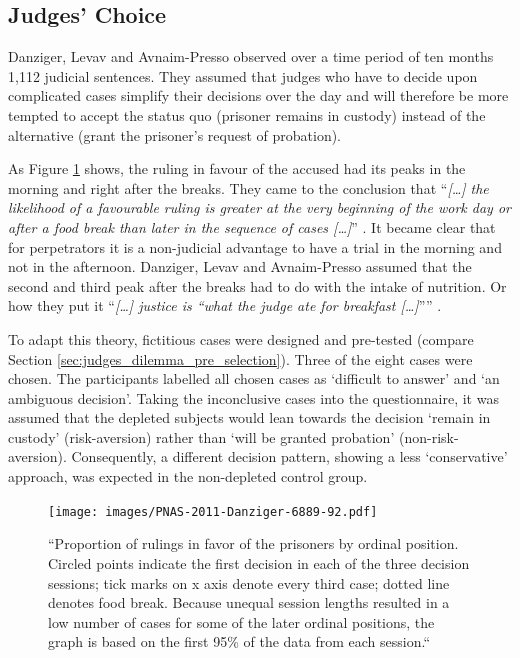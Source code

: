 \subsection{Judges’ Choice}\label{sec:judgeschoice}
Danziger, Levav and Avnaim-Presso \citep{danziger2011extraneous} observed over a time period of ten months 1,112 judicial sentences. They assumed that judges who have to decide upon complicated cases simplify their decisions over the day and will therefore be more tempted to accept the status quo (prisoner remains in custody) instead of the alternative (grant the prisoner’s request of probation).\par
As Figure \ref{fig:decisions_danziger} shows, the ruling in favour of the accused had its peaks in the morning and right after the breaks. They came to the conclusion that “\emph{[\ldots] the likelihood of a favourable ruling is greater at the very beginning of the work day or after a food break than later in the sequence of cases [\ldots]}” \citep[p.~6890]{danziger2011extraneous}. It became clear that for perpetrators it is a non-judicial advantage to have a trial in the morning and not in the afternoon. Danziger, Levav and Avnaim-Presso assumed that the second and third peak after the breaks had to do with the intake of nutrition. Or how they put it “\emph{[\ldots] justice is “what the judge ate for breakfast [\ldots]}”” \citep[p.~6889]{danziger2011extraneous}.\par
To adapt this theory, fictitious cases were designed and pre-tested (compare Section \ref{sec:judges_dilemma_pre_selection}). Three of the eight cases were chosen. The participants labelled all chosen cases as ‘difficult to answer’ and ‘an ambiguous decision’. Taking the inconclusive cases into the questionnaire, it was assumed that the depleted subjects would lean towards the decision ‘remain in custody’ (risk-aversion) rather than ‘will be granted probation’ (non-risk-aversion). Consequently, a different decision pattern, showing a less ‘conservative’ approach, was expected in the non-depleted control group.\par

\begin{figure}[h!]
\center
	\texttt{[image: images/PNAS-2011-Danziger-6889-92.pdf]}
  \caption{“Proportion of rulings in favor of the prisoners by ordinal position. Circled points indicate the first decision in each of the three decision sessions; tick marks on x axis denote every third case; dotted line denotes food break. Because unequal session lengths resulted in a low number of cases for some of the later ordinal positions, the graph is based on the first 95\% of the data from each session.“ \citep{danziger2011extraneous}}\label{fig:decisions_danziger}
\end{figure}

